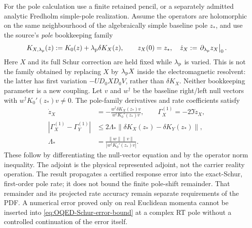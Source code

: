 \documentclass[final,5p,times,twocolumn,numbers,nopreprintline]{elsarticle}
\numberwithin{equation}{section}
\theoremstyle{definition}
\theoremstyle{remark}
\begin{document}
For the pole calculation use a finite retained pencil, or a separately
admitted analytic Fredholm simple-pole realization. Assume the operators
are holomorphic on the same neighbourhood of the algebraically simple
baseline pole \(z_*\), and use the source's \emph{pole} bookkeeping family
\begin{equation}
 K_{X,\lambda_{\rm p}}(z)
       :=K_0(z)+\lambda_{\rm p}\delta K_X(z),\qquad
 z_X(0)=z_*,\quad
 \dot z_X:=\left.\partial_{\lambda_{\rm p}}z_X\right|_0.
 \label{eq:OQED-pole-bookkeeping-family}
\end{equation}
Here \(X\) and its full Schur correction are held fixed while
\(\lambda_{\rm p}\) is varied. This is not the family obtained by
replacing \(X\) by \(\lambda_{\rm p}X\) inside the electromagnetic
resolvent: the latter has first variation \(-UD_0XD_0V\), rather
than \(\delta K_X\). Neither bookkeeping parameter is a new coupling.
Let \(v\) and \(w^\dagger\) be the baseline right/left null vectors
with \(w^\dagger K_0'(z_*)v\ne0\). The pole-family derivatives and
rate coefficients satisfy
\begin{equation}
\begin{aligned}
 \dot z_X&=-\frac{w^\dagger\delta K_X(z_*)v}
                      {w^\dagger K_0'(z_*)v},\qquad
 \Gamma_X^{(1)}=-2\Im\dot z_X,\\
 |\Gamma_X^{(1)}-\Gamma_Y^{(1)}|
 &\leq2\Lambda_*\|\delta K_X(z_*)-\delta K_Y(z_*)\|,\\
 \Lambda_*&=\frac{\|w\|\|v\|}{|w^\dagger K_0'(z_*)v|}.
\end{aligned}
\label{eq:OQED-pole-error-bound}
\end{equation}
These follow by differentiating the null-vector equation and by the
operator norm inequality. The adjoint is the physical represented
adjoint, not the carrier reality operation. The result propagates a
certified response error into the exact-Schur, first-order pole rate;
it does not bound the finite pole-shift remainder. That remainder and
its projected rate accuracy remain separate requirements of the PDF.
A numerical error proved only on real Euclidean momenta cannot be
inserted into \eqref{eq:OQED-Schur-error-bound} at a complex RT pole
without a controlled continuation of the error itself.
\end{document}
